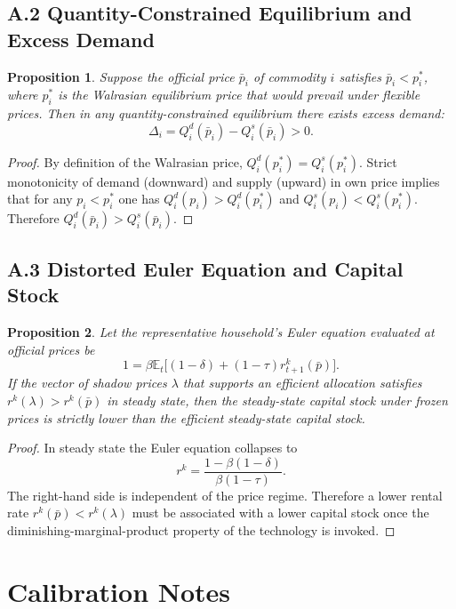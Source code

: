 \documentclass[12pt,anyside]{book}
\theoremstyle{definition}
\theoremstyle{plain}
\newtheorem{proposition}{Proposition}[chapter]
\theoremstyle{remark}
\begin{document}
\subsection*{A.2 Quantity-Constrained Equilibrium and Excess Demand}

\begin{proposition}
\label{prop:excess}
Suppose the official price $\bar{p}_i$ of commodity $i$ satisfies $\bar{p}_i<p_i^*$, where $p_i^*$ is the Walrasian equilibrium price that would prevail under flexible prices. Then in any quantity-constrained equilibrium there exists excess demand:
\[
\Delta_i=Q_i^d(\bar{p}_i)-Q_i^s(\bar{p}_i)>0.
\]
\end{proposition}

\begin{proof}
By definition of the Walrasian price, $Q_i^d(p_i^*)=Q_i^s(p_i^*)$. Strict monotonicity of demand (downward) and supply (upward) in own price implies that for any $p_i<p_i^*$ one has $Q_i^d(p_i)>Q_i^d(p_i^*)$ and $Q_i^s(p_i)<Q_i^s(p_i^*)$. Therefore $Q_i^d(\bar{p}_i)>Q_i^s(\bar{p}_i)$.
\end{proof}

\subsection*{A.3 Distorted Euler Equation and Capital Stock}

\begin{proposition}
\label{prop:euler}
Let the representative household’s Euler equation evaluated at official prices be
\[
1=\beta\mathbb{E}_t\bigl[(1-\delta)+(1-\tau)r_{t+1}^k(\bar{p})\bigr].
\]
If the vector of shadow prices $\lambda$ that supports an efficient allocation satisfies $r^k(\lambda)>r^k(\bar{p})$ in steady state, then the steady-state capital stock under frozen prices is strictly lower than the efficient steady-state capital stock.
\end{proposition}

\begin{proof}
In steady state the Euler equation collapses to
\[
r^k=\frac{1-\beta(1-\delta)}{\beta(1-\tau)}.
\]
The right-hand side is independent of the price regime. Therefore a lower rental rate $r^k(\bar{p})<r^k(\lambda)$ must be associated with a lower capital stock once the diminishing-marginal-product property of the technology is invoked.
\end{proof}

\section{Calibration Notes}
\end{document}
